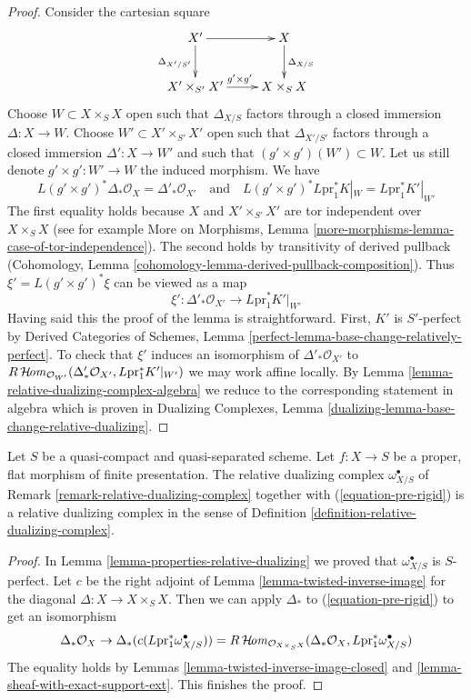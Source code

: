\begin{proof}
Consider the cartesian square
$$
\xymatrix{
X' \ar[d]_{\Delta_{X'/S'}} \ar[r] & X \ar[d]^{\Delta_{X/S}} \\
X' \times_{S'} X' \ar[r]^{g' \times g'} & X \times_S X
}
$$
Choose $W \subset X \times_S X$ open such that $\Delta_{X/S}$
factors through a closed immersion $\Delta : X \to W$.
Choose $W' \subset X' \times_{S'} X'$ open such that $\Delta_{X'/S'}$
factors through a closed immersion $\Delta' : X \to W'$
and such that $(g' \times g')(W') \subset W$. Let us still denote
$g' \times g' : W' \to W$ the induced morphism. We have
$$
L(g' \times g')^*\Delta_*\mathcal{O}_X =
\Delta'_*\mathcal{O}_{X'}
\quad\text{and}\quad
L(g' \times g')^*L\text{pr}_1^*K|_W =
L\text{pr}_1^*K'|_{W'}
$$
The first equality holds because $X$ and $X' \times_{S'} X'$
are tor independent over $X \times_S X$ (see for example
More on Morphisms, Lemma \ref{more-morphisms-lemma-case-of-tor-independence}).
The second holds by transitivity of derived pullback
(Cohomology, Lemma \ref{cohomology-lemma-derived-pullback-composition}).
Thus $\xi' = L(g' \times g')^*\xi$ can be viewed as a map
$$
\xi' : \Delta'_*\mathcal{O}_{X'} \longrightarrow L\text{pr}_1^*K'|_{W'}
$$
Having said this the proof of the lemma is straightforward.
First, $K'$ is $S'$-perfect by Derived Categories of Schemes, Lemma
\ref{perfect-lemma-base-change-relatively-perfect}.
To check that $\xi'$ induces an isomorphism
of $\Delta'_*\mathcal{O}_{X'}$ to
$R\mathop{\mathcal{H}\!\mathit{om}}\nolimits_{\mathcal{O}_{W'}}(
\Delta'_*\mathcal{O}_{X'}, L\text{pr}_1^*K'|_{W'})$
we may work affine locally. By
Lemma \ref{lemma-relative-dualizing-complex-algebra}
we reduce to the corresponding statement in algebra
which is proven in Dualizing Complexes, Lemma
\ref{dualizing-lemma-base-change-relative-dualizing}.
\end{proof}

\begin{lemma}
\label{lemma-flat-proper-relative-dualizing}
Let $S$ be a quasi-compact and quasi-separated scheme.
Let $f : X \to S$ be a proper, flat morphism of finite presentation.
The relative dualizing complex $\omega_{X/S}^\bullet$ of
Remark \ref{remark-relative-dualizing-complex}
together with (\ref{equation-pre-rigid}) is a relative
dualizing complex in the sense of
Definition \ref{definition-relative-dualizing-complex}.
\end{lemma}

\begin{proof}
In Lemma \ref{lemma-properties-relative-dualizing} we proved that
$\omega_{X/S}^\bullet$ is $S$-perfect.
Let $c$ be the right adjoint of
Lemma \ref{lemma-twisted-inverse-image}
for the diagonal $\Delta : X \to X \times_S X$.
Then we can apply $\Delta_*$ to (\ref{equation-pre-rigid})
to get an isomorphism
$$
\Delta_*\mathcal{O}_X \to
\Delta_*(c(L\text{pr}_1^*\omega_{X/S}^\bullet)) =
R\mathop{\mathcal{H}\!\mathit{om}}\nolimits_{\mathcal{O}_{X \times_S X}}(
\Delta_*\mathcal{O}_X, L\text{pr}_1^*\omega_{X/S}^\bullet)
$$
The equality holds by
Lemmas \ref{lemma-twisted-inverse-image-closed} and
\ref{lemma-sheaf-with-exact-support-ext}.
This finishes the proof.
\end{proof}

